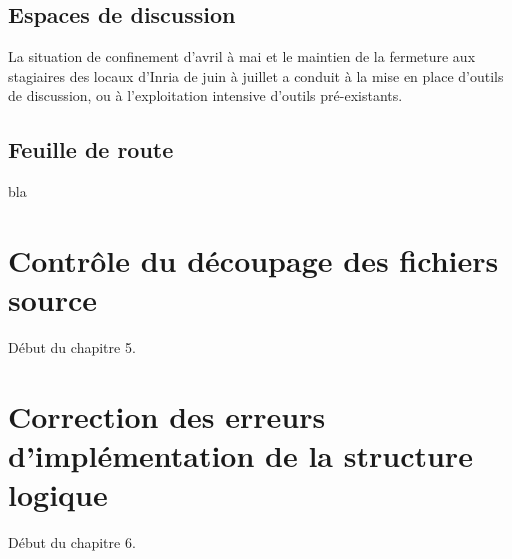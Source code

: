 \section{Espaces de discussion}

La situation de confinement d'avril à mai et le maintien de la fermeture aux stagiaires des locaux d'Inria de juin à juillet a conduit à la mise en place d'outils de discussion, ou à l'exploitation intensive d'outils pré-existants.

\section{Feuille de route}

bla

\chapter{Contrôle du découpage des fichiers source}

Début du chapitre 5.

\chapter[Correction des erreurs d'implémentation]{Correction des erreurs d'implémentation de la structure logique}

Début du chapitre 6.